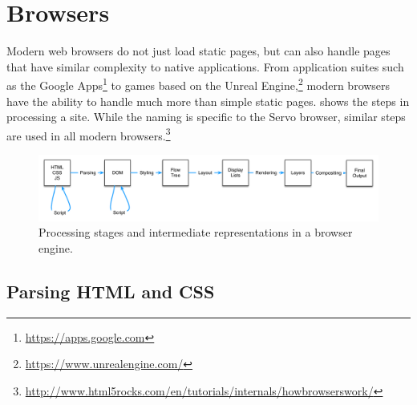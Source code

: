 
\section{Browsers}
\label{sec:browsers}

Modern web browsers do not just load static pages, but can also handle pages that have similar
complexity to native applications.
From application suites such as the Google Apps\footnote{\url{https://apps.google.com}} to games
based on the Unreal Engine,\footnote{\url{https://www.unrealengine.com/}}
modern browsers have the ability to handle much more than simple static pages.
 shows the steps in processing a site.
While the naming is specific to the Servo browser, similar steps are used in all modern browsers.\footnote{\url{http://www.html5rocks.com/en/tutorials/internals/howbrowserswork/}}
\begin{figure}[ht]
  \begin{center}
    \includegraphics[scale=0.55]{pics/browser}
  \end{center}%
  \caption{Processing stages and intermediate representations in a browser engine.}
  \label{fig:browser}
\end{figure}%

\subsection{Parsing HTML and CSS}

